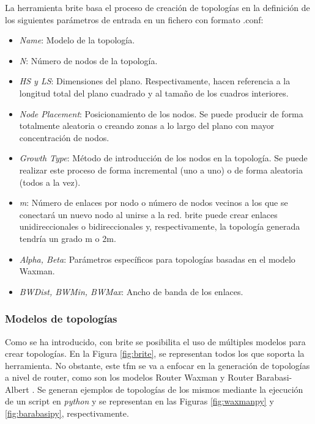 La herramienta \gls{brite} basa el proceso de creación de topologías en la definición de los siguientes parámetros de entrada en un fichero con formato .conf:

\begin{itemize}
    \item \textit{Name}: Modelo de la topología.
    \item \textit{N}: Número de nodos de la topología.  
    \item \textit{HS y LS}: Dimensiones del plano. Respectivamente, hacen referencia a la longitud total del plano cuadrado y al tamaño de los cuadros interiores.
    \item \textit{Node Placement}: Posicionamiento de los nodos. Se puede producir de forma totalmente aleatoria o creando zonas a lo largo del plano con mayor concentración de nodos. 
    \item \textit{Growth Type}: Método de introducción de los nodos en la topología. Se puede realizar este proceso de forma incremental (uno a uno) o de forma aleatoria (todos a la vez). 
    \item \textit{m}: Número de enlaces por nodo o número de nodos vecinos a los que se conectará un nuevo nodo al unirse a la red. \gls{brite} puede crear enlaces unidireccionales o bidireccionales y, respectivamente, la topología generada tendría un grado m o 2m.
    \item \textit{Alpha, Beta}: Parámetros específicos para topologías basadas en el modelo Waxman.
    \item \textit{BWDist, BWMin, BWMax}: Ancho de banda de los enlaces.
\end{itemize}

\subsubsection{Modelos de topologías}
\label{sec:modelostopos}

Como se ha introducido, con \gls{brite} se posibilita el uso de múltiples modelos para crear topologías. En la Figura \ref{fig:brite}, se representan todos los que soporta la herramienta. No obstante, este \gls{tfm} se va a enfocar en la generación de topologías a nivel de router, como son los modelos Router Waxman \cite{waxman} y Router Barabasi-Albert \cite{barabasi}. Se generan ejemplos de topologías de los mismos mediante la ejecución de un script en \textit{python} y se representan en las Figuras \ref{fig:waxmanpy} y \ref{fig:barabasipy}, respectivamente.

